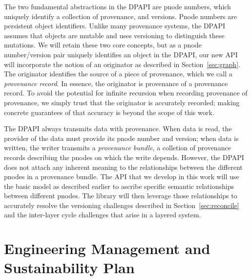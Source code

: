 \documentclass[10pt]{article}
\begin{document}
The two fundamental abstractions in the DPAPI are pnode numbers, which
uniquely identify a collection of provenance, and versions.
Pnode numbers are persistent object identifiers.
Unlike many provenance systems, the DPAPI assumes that objects are
mutable and uses versioning to distinguish these mutations.
We will retain these two core concepts, but as a pnode number/version pair
uniquely identifies an object in the DPAPI, our new API will incorporate
the notion of an originator as described in Section~\ref{sec:graph}.
The originator identifies the source of a piece of provenance, which we call
a \emph{provenance record}.
In essence, the originator is provenance of a provenance record.
To avoid the potential for infinite recursion when recording provenance of
provenance, we simply trust that the originator is accurately
recorded; making concrete guarantees of that accuracy is beyond the scope
of this work.

The DPAPI always transmits data with provenance.
When data is read, the provider of the data must provide its pnode number
and version; when data is written, the writer transmits a
\emph{provenance bundle}, a colletion of provenance records describing
the pnodes on which the write depends.
However, the DPAPI does not attach any inherent meaning to the relationships
between the different pnodes in a provenance bundle.
The API that we develop in this work will use the basic model as
described earlier to ascribe specific semantic relationships between
different pnodes.
The library will then leverage those relationships to accurately
resolve the versioning challenges described in Section~\ref{sec:reconcile}
and the inter-layer cycle challenges that arise in a layered system.


\section{Engineering Management and Sustainability Plan}
\end{document}
